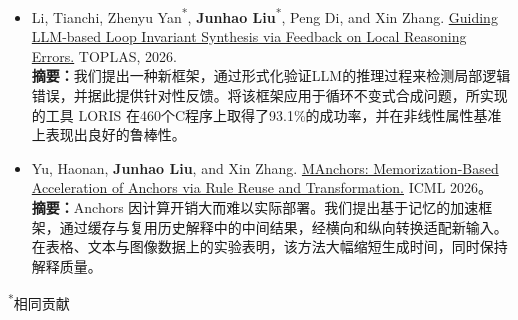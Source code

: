 \documentclass[letterpaper,11pt]{article}
\begin{document}
\begin{itemize}[leftmargin=*]
    \item Li, Tianchi, Zhenyu Yan\textsuperscript{*}, \textbf{Junhao Liu}\textsuperscript{*}, Peng Di, and Xin Zhang. \href{https://dl.acm.org/doi/10.1145/3806652}{Guiding LLM-based Loop Invariant Synthesis via Feedback on Local Reasoning Errors.} TOPLAS, 2026.\vspace{0.2cm}\\
        {\small \textbf{摘要：}我们提出一种新框架，通过形式化验证LLM的推理过程来检测局部逻辑错误，并据此提供针对性反馈。将该框架应用于循环不变式合成问题，所实现的工具 LORIS 在460个C程序上取得了93.1\%的成功率，并在非线性属性基准上表现出良好的鲁棒性。}

    \item Yu, Haonan, \textbf{Junhao Liu}, and Xin Zhang. \href{https://arxiv.org/abs/2502.11068}{MAnchors: Memorization-Based Acceleration of Anchors via Rule Reuse and Transformation.} ICML 2026。\vspace{0.2cm}\\
    {\small \textbf{摘要：}Anchors 因计算开销大而难以实际部署。我们提出基于记忆的加速框架，通过缓存与复用历史解释中的中间结果，经横向和纵向转换适配新输入。在表格、文本与图像数据上的实验表明，该方法大幅缩短生成时间，同时保持解释质量。}
\end{itemize}
\vspace{-8pt}
{\small \hfill \textsuperscript{*}相同贡献}
\end{document}
